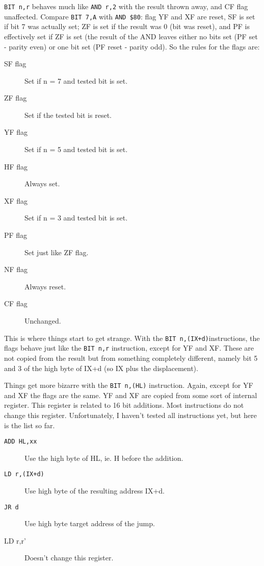 \documentclass[twoside,openright,a4paper]{book}
\begin{document}
{\tt BIT n,r} behaves much like {\tt AND r,2{\raisebox{1ex}{n}}} with the result thrown away, and CF flag unaffected. Compare {\tt BIT 7,A} with {\tt AND \$80}: flag YF and XF are reset, SF is set if bit 7 was actually set; ZF is set if the result was 0 (bit was reset), and PF is effectively set if ZF is set (the result of the AND leaves either no bits set (PF set - parity even) or one bit set (PF reset - parity odd). So the rules for the flags are:

\begin{description}

	\item[SF flag]
	Set if n = 7 and tested bit is set.

	\item[ZF flag]
	Set if the tested bit is reset.

	\item[YF flag]
	Set if n = 5 and tested bit is set.

	\item[HF flag]
	Always set.

	\item[XF flag]
	Set if n = 3 and tested bit is set.

	\item[PF flag]
	Set just like ZF flag.

	\item[NF flag]
	Always reset. 

	\item[CF flag]
	Unchanged.

\end{description}

This is where things start to get strange. With the {\tt BIT n,(IX+d)}instructions, the flags behave just like the {\tt BIT n,r} instruction, except for YF and XF. These are not copied from the result but from something completely different, namely bit 5 and 3 of the high byte of IX+d (so IX plus the displacement).

Things get more bizarre with the {\tt BIT n,(HL)} instruction. Again, except for YF and XF the flags are the same. YF and XF are copied from some sort of internal register. This register is related to 16 bit additions. Most instructions do not change this register. Unfortunately, I haven't tested all instructions yet, but here is the list so far.

\begin{description}

	\item[{\tt ADD HL,xx}]
	Use the high byte of HL, ie. H before the addition.

	\item[{\tt LD r,(IX+d)}]
	Use high byte of the resulting address IX+d.

	\item[{\tt JR d}]
	Use high byte target address of the jump.

	\item[{LD r,r'}]
	Doesn't change this register.

\end{description}
\end{document}
